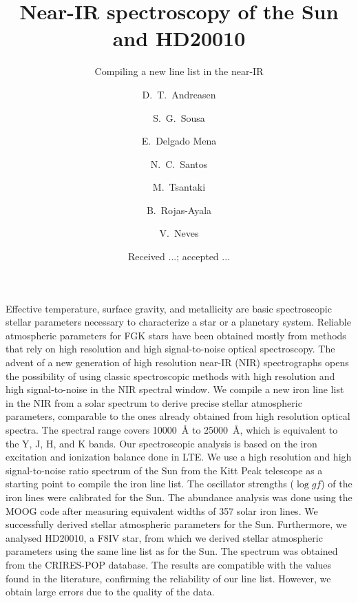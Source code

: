 \documentclass{aa}
\begin{document}
\title{Near-IR spectroscopy of the Sun and HD20010}
\subtitle{Compiling a new line list in the near-IR}


\author{ D.~T.~Andreasen
    \and S.~G.~Sousa
    \and E.~Delgado Mena
    \and N.~C.~Santos
    \and M.~Tsantaki
    \and B.~Rojas-Ayala
    \and V.~Neves}







\date{Received ...; accepted ...}

\abstract
{Effective temperature, surface gravity, and metallicity are basic
spectroscopic stellar parameters necessary to characterize a star or a
planetary system. Reliable atmospheric parameters for FGK stars have
been obtained mostly from methods that rely on high resolution and high
signal-to-noise optical spectroscopy. The advent of a new generation
of high resolution near-IR (NIR) spectrographs opens the possibility
of using classic spectroscopic methods with high resolution and high
signal-to-noise in the NIR spectral window.}
{We compile a new iron line list in the NIR from a solar spectrum to
derive precise stellar atmospheric parameters, comparable to the ones
already obtained from high resolution optical spectra. The spectral
range covers \SI{10000}{\angstrom} to \SI{25000}{\angstrom}, which is
equivalent to the Y, J, H, and K bands.}
{Our spectroscopic analysis is based on the iron excitation and
ionization balance done in LTE. We use a high resolution and high
signal-to-noise ratio spectrum of the Sun from the Kitt Peak telescope
as a starting point to compile the iron line list. The oscillator
strengths ($\log\mathit{gf}$) of the iron lines were calibrated for the
Sun. The abundance analysis was done using the MOOG code after measuring
equivalent widths of 357 solar iron lines.}
{We successfully derived stellar atmospheric parameters for the Sun.
Furthermore, we analysed HD20010, a F8IV star, from which we derived
stellar atmospheric parameters using the same line list as for the Sun.
The spectrum was obtained from the CRIRES-POP database. The results
are compatible with the values found in the literature, confirming the
reliability of our line list. However, we obtain large errors due to the
quality of the data.}
{}
\end{document}
